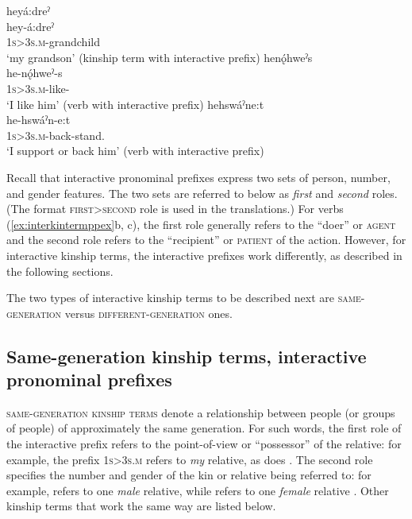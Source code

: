 \ea\label{ex:interkintermppex}
\ea heyá:dreˀ\\\label{ex:interkintermppexa}
\gll hey-á:dreˀ\\
 \textsc{1s>3s.m}-grandchild \\
\glt `my grandson' (kinship term with interactive prefix)
\ex henǫ́hweˀs\\
	\gll he-nǫ́hweˀ-s\\
	\textsc{1s>3s.m}-like-{\habitual} \\
	\glt `I like him' (verb with interactive prefix)
\ex hehswáˀne:t\\
	\gll he-hswáˀn-e:t\\
	\textsc{1s>3s.m}-back-stand.{\stative} \\
	\glt `I support or back him' (verb with interactive prefix)
\z
\z 


Recall that interactive pronominal prefixes express two sets of person, number, and gender features. The two sets are referred to below as \emph{first} and \emph{second} roles. (The format \textsc{first>second} role is used in the translations.) For verbs (\ref{ex:interkintermppex}b, c), the first role generally refers to the “doer” or \textsc{agent} and the second role refers to the “recipient” or \textsc{patient} of the action. However, for interactive kinship terms, the interactive prefixes work differently, as described in the following sections.

The two types of interactive kinship terms to be described next are \textsc{same-generation} versus \textsc{different-generation} ones.  


\subsection{Same-generation kinship terms, interactive pronominal prefixes} \label{ch:Same-generation kinship terms, interactive pronominal prefixes}
\textsc{same-generation kinship terms} denote a relationship between people (or groups of people) of approximately the same generation. For such words, the first role of the interactive prefix refers to the point-of-view or “possessor” of the relative: for example, the prefix  \textsc{1s>3s.m} refers to \emph{my} relative, as does   . The second role specifies the number and gender of the kin or relative being referred to: for example,   refers to one \emph{male} relative, while   refers to one \emph{female} relative . Other kinship terms that work the same way are listed below.

